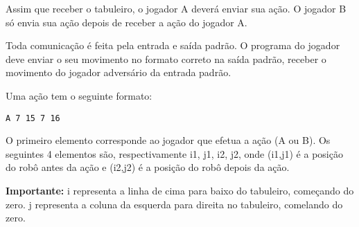 \documentclass[11pt]{article}
\begin{document}
Assim que receber o tabuleiro, o jogador A deverá enviar sua ação. O jogador B só envia sua ação depois de receber a ação do jogador A.

Toda comunicação é feita pela entrada e saída padrão. O programa do jogador deve enviar o seu movimento no formato correto na saída padrão, receber o movimento do jogador adversário da entrada padrão.

Uma ação tem o seguinte formato:
\begin{verbatim}
A 7 15 7 16
\end{verbatim}

O primeiro elemento corresponde ao jogador que efetua a ação (A ou B). Os seguintes 4 elementos são, respectivamente i1, j1, i2, j2, onde (i1,j1) é a posição do robô antes da ação e (i2,j2) é a posição do robô depois da ação.

\textbf{Importante:} i representa a linha de cima para baixo do tabuleiro, começando do zero. j representa a coluna da esquerda para direita no tabuleiro, comelando do zero.
\end{document}
